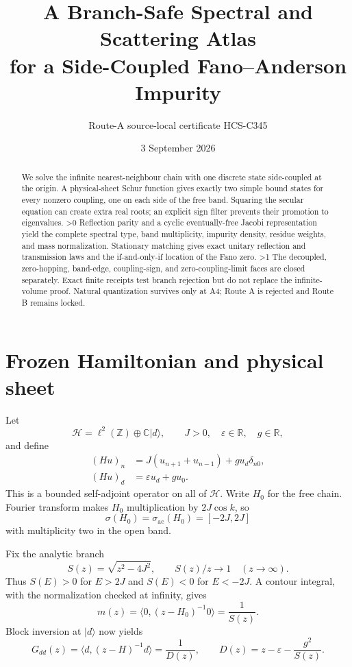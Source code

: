 \documentclass[9pt]{extarticle}
\title{A Branch-Safe Spectral and Scattering Atlas\\
for a Side-Coupled Fano--Anderson Impurity}
\author{Route-A source-local certificate HCS-C345}
\date{3 September 2026}
\providecommand{\CRevisionRound}{2}
\newcommand{\HH}{\mathcal H}
\newcommand{\ac}{\mathrm{ac}}
\begin{document}
\maketitle
\begin{abstract}
We solve the infinite nearest-neighbour chain with one discrete state
side-coupled at the origin.  A physical-sheet Schur function gives exactly
two simple bound states for every nonzero coupling, one on each side of the
free band.  Squaring the secular equation can create extra real roots; an
explicit sign filter prevents their promotion to eigenvalues.
\ifnum\CRevisionRound>0
Reflection parity and a cyclic eventually-free Jacobi representation yield
the complete spectral type, band multiplicity, impurity density, residue
weights, and mass normalization.  Stationary matching gives exact unitary
reflection and transmission laws and the if-and-only-if location of the Fano
zero.
\fi
\ifnum\CRevisionRound>1
The decoupled, zero-hopping, band-edge, coupling-sign, and zero-coupling-limit
faces are closed separately.  Exact finite receipts test branch rejection but
do not replace the infinite-volume proof.  Natural quantization survives only
at A4; Route A is rejected and Route B remains locked.
\fi
\end{abstract}

\section{Frozen Hamiltonian and physical sheet}
Let
\[
 \HH=\ell^2(\mathbb Z)\oplus\mathbb C|d\rangle,
 \qquad J>0,\quad \varepsilon\in\mathbb R,\quad g\in\mathbb R,
\]
and define
\begin{align}
 (Hu)_n&=J(u_{n+1}+u_{n-1})+g u_d\delta_{n0},\label{eq:chain}\\
 (Hu)_d&=\varepsilon u_d+g u_0.\label{eq:impurity}
\end{align}
This is a bounded self-adjoint operator on all of $\HH$.  Write $H_0$ for
the free chain.  Fourier transform makes $H_0$ multiplication by
$2J\cos k$, so
\[
 \sigma(H_0)=\sigma_{\ac}(H_0)=[-2J,2J]
\]
with multiplicity two in the open band.

Fix the analytic branch
\[
 S(z)=\sqrt{z^2-4J^2},\qquad S(z)/z\longrightarrow1
 \quad(z\longrightarrow\infty).
\]
Thus $S(E)>0$ for $E>2J$ and $S(E)<0$ for $E<-2J$.  A contour integral,
with the normalization checked at infinity, gives
\begin{equation}\label{eq:m}
 m(z)=\langle0,(z-H_0)^{-1}0\rangle=\frac1{S(z)}.
\end{equation}
Block inversion at $|d\rangle$ now yields
\begin{equation}\label{eq:schur}
 G_{dd}(z)=\langle d,(z-H)^{-1}d\rangle
 =\frac1{D(z)},\qquad D(z)=z-\varepsilon-\frac{g^2}{S(z)}.
\end{equation}
\end{document}
